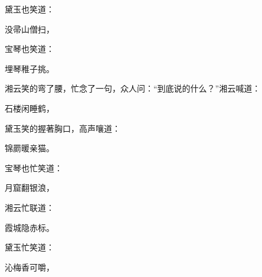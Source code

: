 \begin{parag}
    黛玉也笑道：
\end{parag}
\begin{poem}
    \begin{pl} 没帚山僧扫，\end{pl}
\end{poem}


\begin{parag}
    宝琴也笑道：
\end{parag}
\begin{poem}
    \begin{pl} 埋琴稚子挑。\end{pl}
\end{poem}


\begin{parag}
    湘云笑的弯了腰，忙念了一句，众人问：“到底说的什么？”湘云喊道：
\end{parag}
\begin{poem}
    \begin{pl} 石楼闲睡鹤，\end{pl}
\end{poem}


\begin{parag}
    黛玉笑的握著胸口，高声嚷道：
\end{parag}
\begin{poem}
    \begin{pl} 锦罽暖亲猫。\end{pl}
\end{poem}


\begin{parag}
    宝琴也忙笑道：
\end{parag}
\begin{poem}
    \begin{pl} 月窟翻银浪，\end{pl}
\end{poem}


\begin{parag}
    湘云忙联道：
\end{parag}
\begin{poem}
    \begin{pl} 霞城隐赤标。\end{pl}
\end{poem}


\begin{parag}
    黛玉忙笑道：
\end{parag}
\begin{poem}
    \begin{pl} 沁梅香可嚼，\end{pl}
\end{poem}


